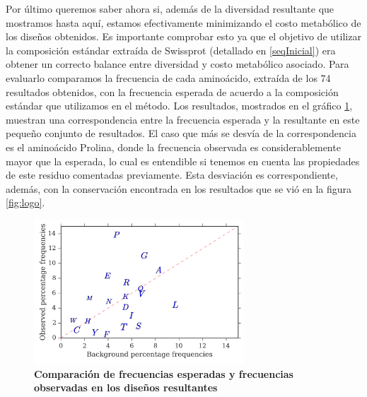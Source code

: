 Por último queremos saber ahora si, además de la diversidad resultante que mostramos hasta aquí, estamos efectivamente minimizando el costo metabólico de los diseños obtenidos.
Es importante comprobar esto ya que el objetivo de utilizar la composición estándar extraída de Swissprot (detallado en \ref{seqInicial}) era obtener un correcto balance entre diversidad y costo metabólico asociado.
Para evaluarlo comparamos la frecuencia de cada aminoácido, extraída de los 74 resultados obtenidos, con la frecuencia esperada de acuerdo a la composición estándar que utilizamos en el método.
Los resultados, mostrados en el gráfico \ref{fig:frequencies}, muestran una correspondencia entre la frecuencia esperada y la resultante en este pequeño conjunto de resultados.
El caso que más se desvía de la correspondencia es el aminoácido Prolina, donde la frecuencia observada es considerablemente mayor que la esperada, lo cual es entendible si tenemos en cuenta las propiedades 
de este residuo comentadas previamente. Esta desviación es correspondiente, además, con la conservación encontrada en los resultados que se vió en la figura \ref{fig:logo}.





\begin{figure}[htbp]
\centering
\includegraphics[width=0.70\textwidth]{img/resultados/frequenciesComparison.png}
\caption{\textbf{Comparación de frecuencias esperadas y frecuencias observadas en los diseños resultantes}}
\label{fig:frequencies}
\end{figure}
